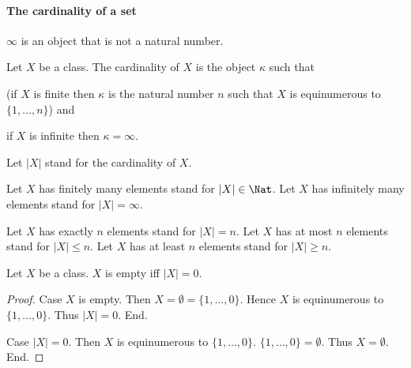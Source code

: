 \documentclass[../arithmetic.tex]{subfiles}
\begin{document}
  \paragraph{The cardinality of a set}

  \begin{forthel}
    \begin{signature}
      $\infty$ is an object that is not a natural number.
    \end{signature}
  \end{forthel}

  \begin{forthel}
    \begin{definition}
      Let $X$ be a class.
      The cardinality of $X$ is the object $\kappa$ such that

      (if $X$ is finite then $\kappa$ is the natural number $n$ such that $X$ is
      equinumerous to $\{ 1, \dots, n \}$) and

      if $X$ is infinite then $\kappa = \infty$.
    \end{definition}

    Let $|X|$ stand for the cardinality of $X$.

    Let $X$ has finitely many elements stand for $|X| \in \Nat$.
    Let $X$ has infinitely many elements stand for $|X| = \infty$.

    Let $X$ has exactly $n$ elements stand for $|X| = n$.
    Let $X$ has at most $n$ elements stand for $|X| \leq n$.
    Let $X$ has at least $n$ elements stand for $|X| \geq n$.
  \end{forthel}

  \begin{forthel}
    \begin{proposition}
      Let $X$ be a class.
      $X$ is empty iff $|X| = 0$.
    \end{proposition}
    \begin{proof}
      Case $X$ is empty.
        Then $X = \emptyset = \{ 1, \dots, 0 \}$.
        Hence $X$ is equinumerous to $\{ 1, \dots, 0 \}$.
        Thus $|X| = 0$.
      End.

      Case $|X| = 0$.
        Then $X$ is equinumerous to $\{ 1, \dots, 0 \}$.
        $\{ 1, \dots, 0 \} = \emptyset$.
        Thus $X = \emptyset$.
      End.
    \end{proof}
  \end{forthel}
\end{document}
